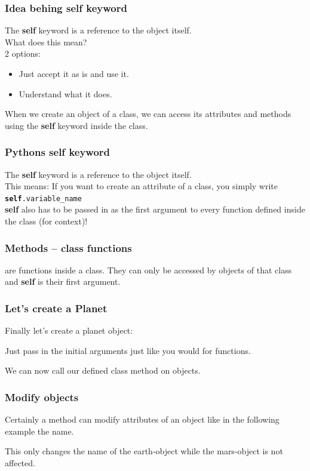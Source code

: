 \documentclass{beamer}
\begin{document}
\begin{frame}
  \frametitle{Idea behing self keyword}
  The \textbf{self} keyword is a reference to the object itself.\\
  \vspace{5mm}
  What does this mean?\\
  \vspace{5mm}
  2 options: 
  \begin{itemize}
    \item Just accept it as is and use it.\\
    \item Understand what it does.\\
  \end{itemize}
  When we create an object of a class, we can access its attributes and methods using the \textbf{self} keyword inside the class.\\
\end{frame}
\begin{frame}
  \frametitle{Pythons self keyword}
  The \textbf{self} keyword is a reference to the object itself.\\
  
  This means: If you want to create an attribute of a class, you simply write \texttt{\textbf{self}.variable\_name}\\
  \vspace{5mm}
  \textbf{self} also has to be passed in as the first argument to every function defined inside the class (for context)! 
\end{frame}
\begin{frame}
  \frametitle{Methods -- class functions}
  \textbf{} are functions inside a class. They can only be accessed by objects of that class and \textbf{self} is their first argument.  
  
\end{frame}
\begin{frame}
  \frametitle{Let's create a Planet}
  Finally let's create a planet object: 
  
  Just pass in the initial arguments just like you would for functions. 
  
  We can now call our defined class method on objects. 
\end{frame}
\begin{frame}
  \frametitle{Modify objects}
  Certainly a method can modify attributes of an object like in the following example the name. 
    

    
  This only changes the name of the \glq earth\grq-object while the \glq mars\grq-object is not affected. 
\end{frame}
\end{document}
